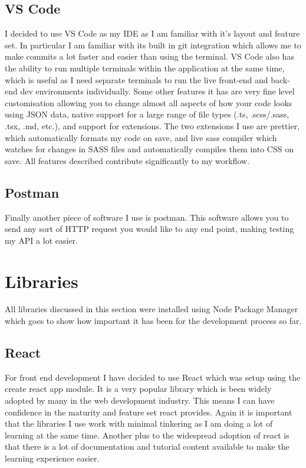 \documentclass[]{final_report}
\begin{document}
\subsection{VS Code}
I decided to use VS Code as my IDE as I am familiar with it's layout and feature set. In particular I am familiar with its built in git integration which allows me to make commits a lot faster and easier than using the terminal. VS Code also has the ability to run multiple terminals within the application at the same time, which is useful as I need separate terminals to run the live front-end and back-end dev environments individually. Some other features it has are very fine level customisation allowing you to change almost all aspects of how your code looks using JSON data, native support for a large range of file types (.ts, .scss/.sass, .tsx, .md, etc.), and support for extensions. The two extensions I use are prettier, which automatically formats my code on save, and live sass compiler which watches for changes in SASS files and automatically compiles them into CSS on save. All features described contribute significantly to my workflow.

\subsection{Postman}
Finally another piece of software I use is postman. This software allows you to send any sort of HTTP request you would like to any end point, making testing my API a lot easier.

\section {Libraries}

All libraries discussed in this section were installed using Node Package Manager which goes to show how important it has been for the development process so far.

\subsection{React}
For front end development I have decided to use React which was setup using the create react app module. It is a very popular library which is been widely adopted by many in the web development industry. This means I can have confidence in the maturity and feature set react provides. Again it is important that the libraries I use work with minimal tinkering as I am doing a lot of learning at the same time. Another plus to the widespread adoption of react is that there is a lot of documentation and tutorial content available to make the learning experience easier.
\end{document}
